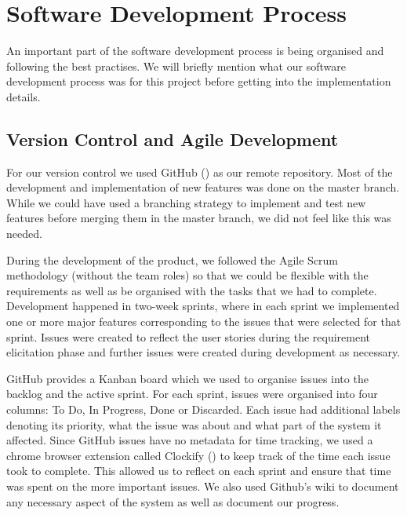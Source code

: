 \documentclass{l4proj}
\begin{document}
\section{Software Development Process}

An important part of the software development process is being organised and following the best practises. We will briefly mention what our software development process was for this project before getting into the implementation details.

\subsection{Version Control and Agile Development}
For our version control we used GitHub (\cite{github}) as our remote repository. Most of the development and implementation of new features was done on the master branch. While we could have used a branching strategy to implement and test new features before merging them in the master branch, we did not feel like this was needed.

During the development of the product, we followed the Agile Scrum methodology (without the team roles) so that we could be flexible with the requirements as well as be organised with the tasks that we had to complete. Development happened in two-week sprints, where in each sprint we implemented one or more major features corresponding to the issues that were selected for that sprint. Issues were created to reflect the user stories during the requirement elicitation phase and further issues were created during development as necessary. 

GitHub provides a Kanban board which we used to organise issues into the backlog and the active sprint. For each sprint, issues were organised into four columns: To Do, In Progress, Done or Discarded. Each issue had additional labels denoting its priority, what the issue was about and what part of the system it affected. Since GitHub issues have no metadata for time tracking, we used a chrome browser extension called Clockify (\cite{clock}) to keep track of the time each issue took to complete. This allowed us to reflect on each sprint and ensure that time was spent on the more important issues. We also used Github's wiki to document any necessary aspect of the system as well as document our progress.
\end{document}
